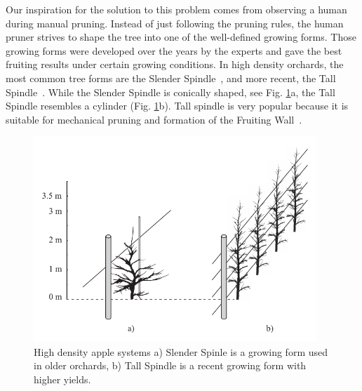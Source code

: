 Our inspiration for the solution to this problem comes from observing a
human during manual pruning. Instead of just following the pruning
rules, the human pruner strives to shape the tree into one of the
well-defined growing forms. Those growing forms were developed over the
years by the experts and gave the best fruiting results under certain
growing conditions. In high density orchards, the most common tree
forms are the Slender Spindle~\cite{weber_optimizing_2000}, and more recent, the Tall
Spindle~\cite{robinson_vision_2013}. While the Slender Spindle is conically shaped, see Fig. \ref{fig:my_figure2a}a,
the Tall Spindle resembles a cylinder (Fig. \ref{fig:my_figure2a}b). Tall spindle is very popular because it
is suitable for mechanical pruning and formation of the Fruiting Wall~\cite{robinson_vision_2013}.

\begin{figure}[hbt]
    \centering
    \includegraphics[width=4.2in]{figs/Fig3.pdf}
    \caption{High density apple systems a) Slender Spinle is a growing form used in older orchards, b) Tall Spindle is a recent growing form with higher yields.}
    \label{fig:my_figure2a}
\end{figure}


